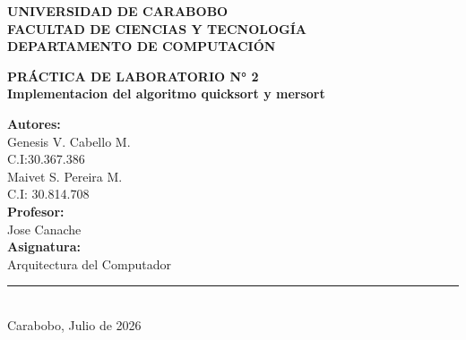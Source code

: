 \documentclass[12pt, a4paper]{article}
\begin{document}
\begin{titlepage}
    \begin{center}
        \textbf{\large UNIVERSIDAD DE CARABOBO} \\
        \textbf{\large FACULTAD DE CIENCIAS Y TECNOLOGÍA} \\
        \textbf{\large DEPARTAMENTO DE COMPUTACIÓN} \\
        \vspace*{0.5cm}
        
        \vspace*{6cm} %
        
        \textbf{\LARGE PRÁCTICA DE LABORATORIO N° 2} \\[0.4cm]
        \textbf{\Large Implementacion del algoritmo quicksort y mersort } \\
        
        \vspace*{6.8cm} %
        
        \begin{flushright}
            \begin{minipage}{0.5\linewidth}
                \normalsize
                \textbf{Autores:} \\
                Genesis V. Cabello M. \\
                \vspace*{0.3cm}
                C.I:30.367.386\\
                Maivet S. Pereira M.\\
                \vspace*{0.3cm}
                C.I: 30.814.708\\
                \textbf{Profesor:} \\
                \vspace*{0.3cm}
                Jose Canache \\
                \textbf{Asignatura:} \\
                Arquitectura del Computador
            \end{minipage}
        \end{flushright}
        
        \vfill %
        
        \rule{\linewidth}{0.5mm} \\ %
        \vspace*{0.2cm}
        \normalsize Carabobo, Julio de 2026
        
    \end{center}
\end{titlepage}
\end{document}

